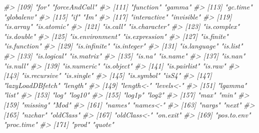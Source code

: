 \documentclass[
]{book}
\newenvironment{Shaded}{\begin{snugshade}}{\end{snugshade}}
\newcommand{\CommentTok}[1]{\textcolor[rgb]{0.56,0.35,0.01}{\textit{#1}}}
\begin{document}
\begin{Shaded}
\begin{Highlighting}[]
\CommentTok{\#\textgreater{} [109] "for"                  "forceAndCall"        }
\CommentTok{\#\textgreater{} [111] "function"             "gamma"               }
\CommentTok{\#\textgreater{} [113] "gc.time"              "globalenv"           }
\CommentTok{\#\textgreater{} [115] "if"                   "Im"                  }
\CommentTok{\#\textgreater{} [117] "interactive"          "invisible"           }
\CommentTok{\#\textgreater{} [119] "is.array"             "is.atomic"           }
\CommentTok{\#\textgreater{} [121] "is.call"              "is.character"        }
\CommentTok{\#\textgreater{} [123] "is.complex"           "is.double"           }
\CommentTok{\#\textgreater{} [125] "is.environment"       "is.expression"       }
\CommentTok{\#\textgreater{} [127] "is.finite"            "is.function"         }
\CommentTok{\#\textgreater{} [129] "is.infinite"          "is.integer"          }
\CommentTok{\#\textgreater{} [131] "is.language"          "is.list"             }
\CommentTok{\#\textgreater{} [133] "is.logical"           "is.matrix"           }
\CommentTok{\#\textgreater{} [135] "is.na"                "is.name"             }
\CommentTok{\#\textgreater{} [137] "is.nan"               "is.null"             }
\CommentTok{\#\textgreater{} [139] "is.numeric"           "is.object"           }
\CommentTok{\#\textgreater{} [141] "is.pairlist"          "is.raw"              }
\CommentTok{\#\textgreater{} [143] "is.recursive"         "is.single"           }
\CommentTok{\#\textgreater{} [145] "is.symbol"            "isS4"                }
\CommentTok{\#\textgreater{} [147] "lazyLoadDBfetch"      "length"              }
\CommentTok{\#\textgreater{} [149] "length\textless{}{-}"             "levels\textless{}{-}"            }
\CommentTok{\#\textgreater{} [151] "lgamma"               "list"                }
\CommentTok{\#\textgreater{} [153] "log"                  "log10"               }
\CommentTok{\#\textgreater{} [155] "log1p"                "log2"                }
\CommentTok{\#\textgreater{} [157] "max"                  "min"                 }
\CommentTok{\#\textgreater{} [159] "missing"              "Mod"                 }
\CommentTok{\#\textgreater{} [161] "names"                "names\textless{}{-}"             }
\CommentTok{\#\textgreater{} [163] "nargs"                "next"                }
\CommentTok{\#\textgreater{} [165] "nzchar"               "oldClass"            }
\CommentTok{\#\textgreater{} [167] "oldClass\textless{}{-}"           "on.exit"             }
\CommentTok{\#\textgreater{} [169] "pos.to.env"           "proc.time"           }
\CommentTok{\#\textgreater{} [171] "prod"                 "quote"               }

\end{Highlighting}
\end{Shaded}
\end{document}
